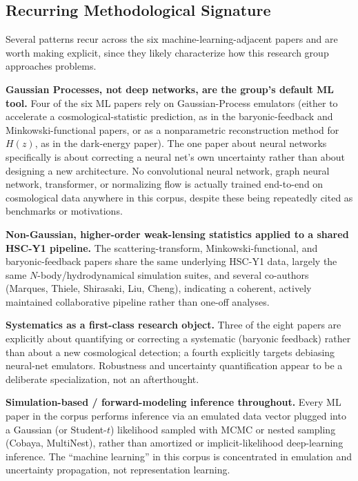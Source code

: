 \documentclass[11pt]{article}
\begin{document}
\subsection{Recurring Methodological Signature}

Several patterns recur across the six machine-learning-adjacent papers and are worth making explicit, since they likely characterize how this research group approaches problems.

\textbf{Gaussian Processes, not deep networks, are the group's default ML tool.} Four of the six ML papers rely on Gaussian-Process emulators (either to accelerate a cosmological-statistic prediction, as in the baryonic-feedback and Minkowski-functional papers, or as a nonparametric reconstruction method for $H(z)$, as in the dark-energy paper). The one paper about neural networks specifically is about correcting a neural net's own uncertainty rather than about designing a new architecture. No convolutional neural network, graph neural network, transformer, or normalizing flow is actually trained end-to-end on cosmological data anywhere in this corpus, despite these being repeatedly cited as benchmarks or motivations.

\textbf{Non-Gaussian, higher-order weak-lensing statistics applied to a shared HSC-Y1 pipeline.} The scattering-transform, Minkowski-functional, and baryonic-feedback papers share the same underlying HSC-Y1 data, largely the same $N$-body/hydrodynamical simulation suites, and several co-authors (Marques, Thiele, Shirasaki, Liu, Cheng), indicating a coherent, actively maintained collaborative pipeline rather than one-off analyses.

\textbf{Systematics as a first-class research object.} Three of the eight papers are explicitly about quantifying or correcting a systematic (baryonic feedback) rather than about a new cosmological detection; a fourth explicitly targets debiasing neural-net emulators. Robustness and uncertainty quantification appear to be a deliberate specialization, not an afterthought.

\textbf{Simulation-based / forward-modeling inference throughout.} Every ML paper in the corpus performs inference via an emulated data vector plugged into a Gaussian (or Student-$t$) likelihood sampled with MCMC or nested sampling (Cobaya, MultiNest), rather than amortized or implicit-likelihood deep-learning inference. The ``machine learning'' in this corpus is concentrated in emulation and uncertainty propagation, not representation learning.
\end{document}
